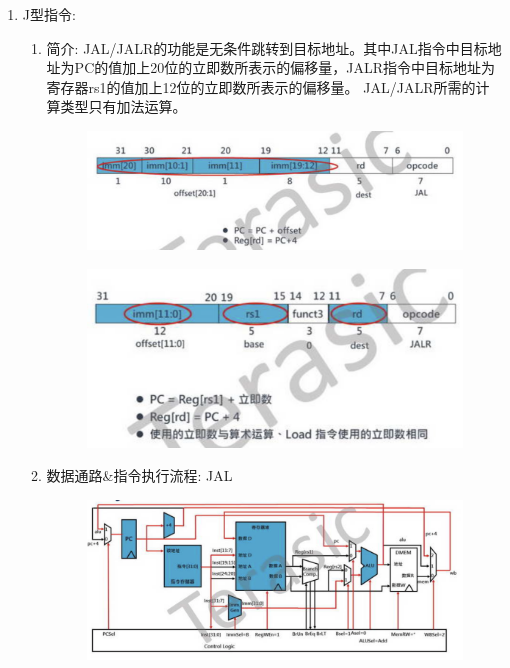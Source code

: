 \documentclass[a4paper, 14pt, oneside]{book} %
\numberwithin{equation}{subsection}
\begin{document}
\begin{enumerate}
\begin{enumerate}
\begin{figure}[!htbp]
							\end{figure}
					\end{enumerate}
				\item{J型指令:}
					\begin{enumerate}
						\item{简介:}
							\subitem
								JAL/JALR的功能是无条件跳转到目标地址。其中JAL指令中目标地址为PC的值加上20位的立即数所表示的偏移量，JALR指令中目标地址为寄存器rs1的值加上12位的立即数所表示的偏移量。
								JAL/JALR所需的计算类型只有加法运算。
								\begin{figure}[!htbp]
									\centering
									\includegraphics[scale=0.5]{img/j11.png}
								\end{figure}
								\begin{figure}[!htbp]
									\centering
									\includegraphics[scale=0.5]{img/j12.png}
								\end{figure}
						\item{数据通路\&指令执行流程:}
							\subitem
								JAL
							\begin{figure}[!htbp]
								\centering
								\includegraphics[scale=0.5]{img/j21.png}

\end{figure}
\end{enumerate}
\end{enumerate}
\end{document}
